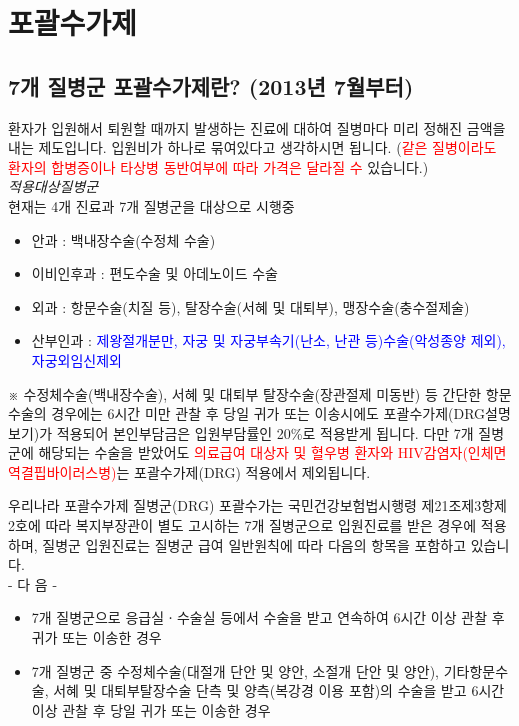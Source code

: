 \section{포괄수가제}
\subsection{7개 질병군 포괄수가제란? (2013년 7월부터)}
환자가 입원해서 퇴원할 때까지 발생하는 진료에 대하여 질병마다 미리 정해진 금액을 내는 제도입니다. 입원비가 하나로 묶여있다고 생각하시면 됩니다. (\textcolor{red}{같은 질병이라도 환자의 합병증이나 타상병 동반여부에 따라 가격은 달라질 수} 있습니다.)\\
\prezi{\clearpage}
\emph{적용대상질병군}\\ 
현재는 4개 진료과 7개 질병군을 대상으로 시행중
\begin{itemize}\tightlist
\item 안과 : 백내장수술(수정체 수술) 
\item 이비인후과 : 편도수술 및 아데노이드 수술 
\item 외과 : 항문수술(치질 등), 탈장수술(서혜 및 대퇴부), 맹장수술(충수절제술) 
\item 산부인과 : \textcolor{blue}{제왕절개분만, 자궁 및 자궁부속기(난소, 난관 등)수술(악성종양 제외), 자궁외임신제외}
\end{itemize}
※ 수정체수술(백내장수술), 서혜 및 대퇴부 탈장수술(장관절제 미동반) 등 간단한 항문수술의 경우에는 6시간 미만 관찰 후 당일 귀가 또는 이송시에도 포괄수가제(DRG설명보기)가 적용되어 본인부담금은 입원부담률인 20\%로 적용받게 됩니다. 다만 7개 질병군에 해당되는 수술을 받았어도 \textcolor{red}{의료급여 대상자 및 혈우병 환자와 HIV감염자(인체면역결핍바이러스병)}는 포괄수가제(DRG) 적용에서 제외됩니다.
\prezi{\clearpage}
\begin{Cdoing}{우리나라 포괄수가제}
질병군(DRG) 포괄수가는 국민건강보험법시행령 제21조제3항제2호에 따라 복지부장관이 별도 고시하는 7개 질병군으로 입원진료를 받은 경우에 적용하며, 질병군 입원진료는 질병군 급여 일반원칙에 따라 다음의 항목을 포함하고 있습니다.\\
- 다 음 -
\begin{itemize}\tightlist
\item 7개 질병군으로 응급실ㆍ수술실 등에서 수술을 받고 연속하여 6시간 이상 관찰 후 귀가 또는 이송한 경우 
\item 7개 질병군 중 수정체수술(대절개 단안 및 양안, 소절개 단안 및 양안), 기타항문수술, 서혜 및 대퇴부탈장수술 단측 및 양측(복강경 이용 포함)의 수술을 받고 6시간 이상 관찰 후 당일 귀가 또는 이송한 경우
\end{itemize}
\end{Cdoing}

